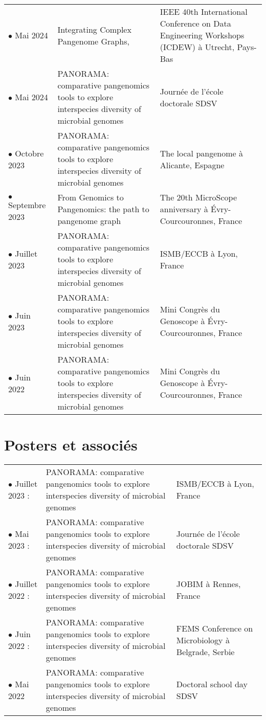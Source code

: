 \begin{table}[htbp]
    \centering
    \begin{tabular}{l p{} p{}}
$\bullet$ Mai 2024 & Integrating Complex Pangenome Graphs,
& IEEE 40th International Conference on Data Engineering Workshops (ICDEW) à Utrecht, Pays-Bas \\
$\bullet$ Mai 2024 & PANORAMA: comparative pangenomics tools to explore interspecies diversity of microbial genomes & Journée de l'école doctorale SDSV \\
$\bullet$ Octobre 2023 & PANORAMA: comparative pangenomics tools to explore interspecies diversity of microbial genomes & The local pangenome à Alicante, Espagne \\
$\bullet$ Septembre 2023 & From Genomics to Pangenomics: the path to pangenome graph & The 20th MicroScope anniversary à Évry-Courcouronnes, France \\
$\bullet$ Juillet 2023 & PANORAMA: comparative pangenomics tools to explore interspecies diversity of microbial genomes & ISMB/ECCB à Lyon, France \\
$\bullet$ Juin 2023 & PANORAMA: comparative pangenomics tools to explore interspecies diversity of microbial genomes & Mini Congrès du Genoscope à Évry-Courcouronnes, France \\
$\bullet$ Juin 2022 & PANORAMA: comparative pangenomics tools to explore interspecies diversity of microbial genomes & Mini Congrès du Genoscope à Évry-Courcouronnes, France \\
    \end{tabular}
\end{table}

\newpage

\section{Posters et associés}

\begin{table}[htbp]
    \centering
    \begin{tabular}{l p{} p{}}
$\bullet$ Juillet 2023 :& PANORAMA: comparative pangenomics tools to explore interspecies diversity of microbial genomes & ISMB/ECCB à Lyon, France\\
$\bullet$ Mai 2023 :& PANORAMA: comparative pangenomics tools to explore interspecies diversity of microbial genomes & Journée de l'école doctorale SDSV \\
$\bullet$ Juillet 2022 :& PANORAMA: comparative pangenomics tools to explore interspecies diversity of microbial genomes & JOBIM à Rennes, France \\
$\bullet$ Juin 2022 :& PANORAMA: comparative pangenomics tools to explore interspecies diversity of microbial genomes & FEMS Conference on Microbiology à Belgrade, Serbie
\\
$\bullet$ Mai 2022 & PANORAMA: comparative pangenomics tools to explore interspecies diversity of microbial genomes & Doctoral school day SDSV \\
    \end{tabular}
\end{table}


